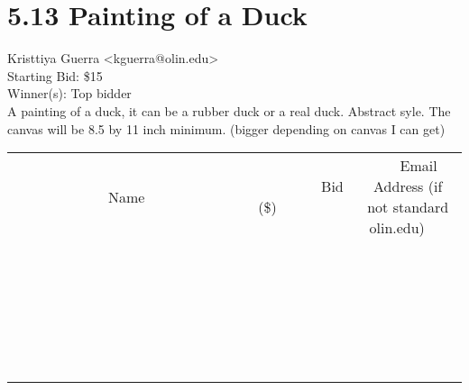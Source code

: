 \documentclass[11pt]{article}
\begin{document}
					\section*{5.13 Painting of a Duck}
					Kristtiya Guerra <kguerra@olin.edu> \\
					Starting Bid: \$15 \\
					Winner(s): Top bidder \\
					A painting of a duck, it can be a rubber duck or a real duck. Abstract syle. The canvas will be 8.5 by 11 inch minimum. (bigger depending on canvas I can get) \\
					[6ex]
					\begin{tabular}{c c c}
						~~~~~~~~~~~~~Name~~~~~~~~~~~~~ & ~~~~~~~~~Bid (\$)~~~~~~~~~ & ~~~Email Address (if not standard olin.edu)~~~ \\
				
 & & \\
\hline
 & & \\
\hline
 & & \\
\hline
 & & \\
\hline
 & & \\
\hline
 & & \\
\hline
 & & \\
\hline
 & & \\
\hline
 & & \\
\hline
 & & \\
\hline
 & & \\
\hline
 & & \\
\hline
 & & \\
\hline
 & & \\
\hline
 & & \\
\hline
 & & \\
\hline
 & & \\
\hline
 & & \\
\hline
 & & \\
\hline
 & & \\
\hline
 & & \\
\hline
 & & \\
\hline
 & & \\
\hline
 & & \\
\hline
 & & \\
\hline
 & & \\
\hline
					\end{tabular}
					\clearpage
				
\end{document}
